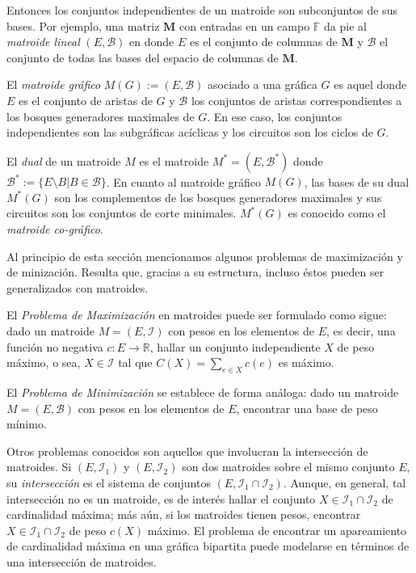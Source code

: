 Entonces los conjuntos independientes de un matroide son subconjuntos de sus bases. Por ejemplo, una matriz $\mathbf{M}$ con entradas en un campo $\mathbb{F}$ da pie al \textit{matroide lineal} $(E, \mathcal{B})$ en donde $E$ es el conjunto de columnas de $\mathbf{M}$ y $\mathcal{B}$ el conjunto de todas las bases del espacio de columnas de $\mathbf{M}$.

El \textit{matroide gráfico} $M(G):= (E, \mathcal{B})$ asociado a una gráfica $G$ es aquel donde $E$ es el conjunto de aristas de $G$ y $\mathcal{B}$ los conjuntos de aristas correspondientes a los bosques generadores maximales de $G$. En ese caso, los conjuntos independientes son las subgráficas acíclicas y los circuitos son los ciclos de $G$.

El \textit{dual} de un matroide $M$ es el matroide $M^{*} = (E,\mathcal{B}^{*})$ donde $\mathcal{B}^{*}:=\{E\setminus B | B \in \mathcal{B}\}$. En cuanto al matroide gráfico $M(G)$, las bases de su dual $M^{*}(G)$ son los complementos de los bosques generadores maximales y sus circuitos son los conjuntos de corte minimales. $M^{*}(G)$ es conocido como el \textit{matroide co-gráfico}.

Al principio de esta sección mencionamos algunos problemas de maximización y de minización. Resulta que, gracias a su estructura, incluso éstos pueden ser generalizados con matroides.

El \textit{Problema de Maximización} en matroides puede ser formulado como sigue: dado un matroide $M=(E,\mathcal{I})$ con pesos en los elementos de $E$, es decir, una función no negativa $c \colon E \rightarrow \mathbb{R}$, hallar un conjunto independiente $X$ de peso máximo, o sea, $X\in \mathcal{I}$ tal que $C(X) = \sum_{e \in X}c(e)$ es máximo.

El \textit{Problema de Minimización} se establece de forma análoga: dado un matroide $M=(E,\mathcal{B})$ con pesos en los elementos de $E$, encontrar una base de peso mínimo.

Otros problemas conocidos son aquellos que involucran la intersección de matroides. Si $(E,\mathcal{I}_{1})$ y $(E,\mathcal{I}_{2})$ son dos matroides sobre el mismo conjunto $E$, su \textit{intersección} es el sistema de conjuntos $(E,\mathcal{I}_{1} \cap \mathcal{I}_{2})$. Aunque, en general, tal intersección no es un matroide, es de interés hallar el conjunto $X \in \mathcal{I}_{1} \cap \mathcal{I}_{2} $ de cardinalidad máxima; más aún, si los matroides tienen pesos, encontrar $X \in \mathcal{I}_{1} \cap \mathcal{I}_{2}$ de peso $c(X)$ máximo. El problema de encontrar un apareamiento de cardinalidad máxima en una gráfica bipartita puede modelarse en términos de una intersección de matroides.

